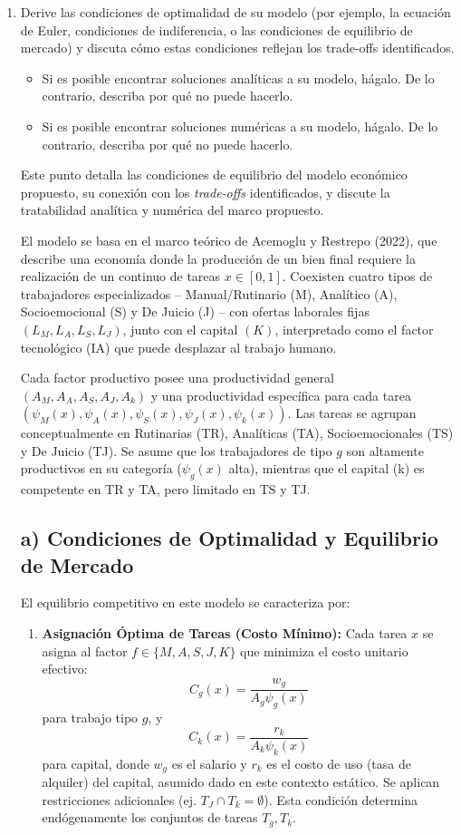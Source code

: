 \documentclass{article}
\theoremstyle{remark}
\theoremstyle{definition}
\begin{document}
\begin{enumerate}
    \item Derive las condiciones de optimalidad de su modelo (por ejemplo, la ecuación de Euler, condiciones de indiferencia, o las condiciones de equilibrio de mercado) y discuta cómo estas condiciones reflejan los trade-offs identificados.
    \begin{itemize}
        \item Si es posible encontrar soluciones analíticas a su modelo, hágalo. De lo contrario, describa por qué no puede hacerlo.
        \item Si es posible encontrar soluciones numéricas a su modelo, hágalo. De lo contrario, describa por qué no puede hacerlo.
    \end{itemize}
        \begin{tcolorbox}[title= Solución Punto 4 (Revisado y Justificado)]

Este punto detalla las condiciones de equilibrio del modelo económico propuesto, su conexión con los \textit{trade-offs} identificados, y discute la tratabilidad analítica y numérica del marco propuesto.

El modelo se basa en el marco teórico de Acemoglu y Restrepo (2022), que describe una economía donde la producción de un bien final requiere la realización de un continuo de tareas $x \in [0, 1]$. Coexisten cuatro tipos de trabajadores especializados -- Manual/Rutinario (M), Analítico (A), Socioemocional (S) y De Juicio (J) -- con ofertas laborales fijas $(L_M, L_A, L_S, L_J)$, junto con el capital $(K)$, interpretado como el factor tecnológico (IA) que puede desplazar al trabajo humano.

Cada factor productivo posee una productividad general $(A_M, A_A, A_S, A_J, A_k)$ y una productividad específica para cada tarea $(\psi_M(x), \psi_A(x), \psi_S(x), \psi_J(x), \psi_k(x))$. Las tareas se agrupan conceptualmente en Rutinarias (TR), Analíticas (TA), Socioemocionales (TS) y De Juicio (TJ). Se asume que los trabajadores de tipo $g$ son altamente productivos en su categoría ($\psi_g(x)$ alta), mientras que el capital (k) es competente en TR y TA, pero limitado en TS y TJ.

\subsection*{a) Condiciones de Optimalidad y Equilibrio de Mercado}

El equilibrio competitivo en este modelo se caracteriza por:

\begin{enumerate}
    \item \textbf{Asignación Óptima de Tareas (Costo Mínimo):} Cada tarea $x$ se asigna al factor $f \in \{M, A, S, J, K\}$ que minimiza el costo unitario efectivo:
        \[ C_g(x) = \frac{w_g}{A_g \psi_g(x)} \]
        para trabajo tipo $g$, y
        \[ C_k(x) = \frac{r_k}{A_k \psi_k(x)} \]
        para capital, donde $w_g$ es el salario y $r_k$ es el costo de uso (tasa de alquiler) del capital, asumido dado en este contexto estático. Se aplican restricciones adicionales (ej. $T_J \cap T_k = \emptyset$). Esta condición determina endógenamente los conjuntos de tareas $T_g, T_k$.


\end{enumerate}
\end{tcolorbox}
\end{enumerate}
\end{document}
